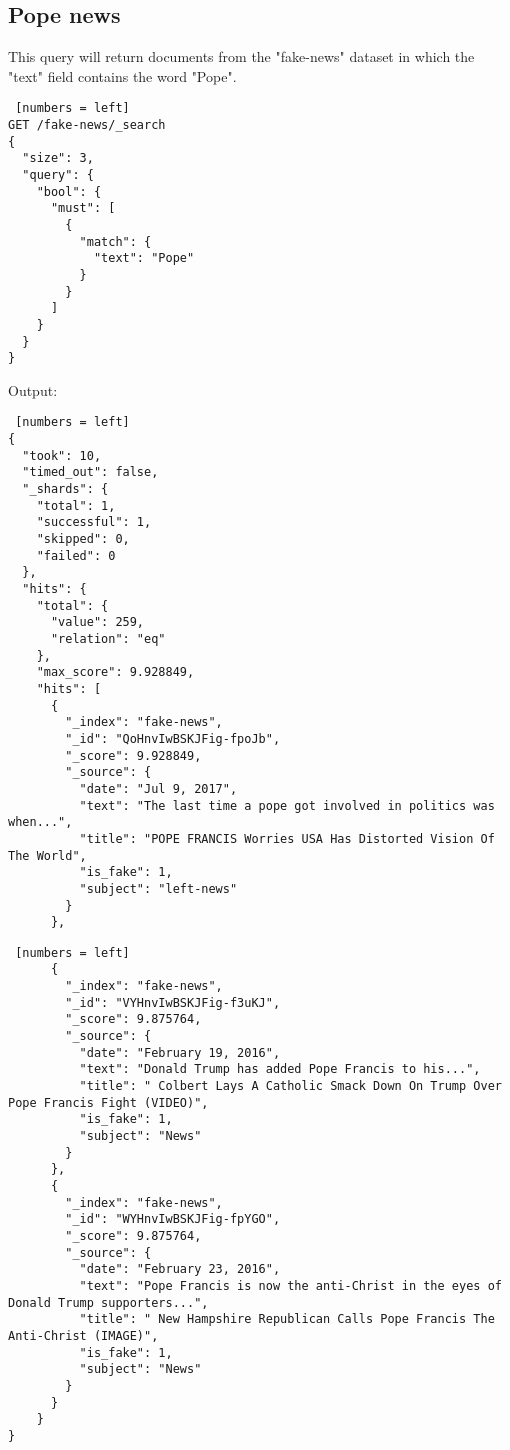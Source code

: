 \subsection{Pope news}
This query will return documents from the "fake-news" dataset in which the "text" field contains the word "Pope".\\

\begin{algorithm}[ht]
\caption{Pope news}
\begin{lstlisting} [numbers = left]
GET /fake-news/_search
{ 
  "size": 3,
  "query": {
    "bool": {
      "must": [
        {
          "match": {
            "text": "Pope"
          }
        }
      ]
    }
  }
}
\end{lstlisting}
\end{algorithm}
\newpage

Output:
\begin{algorithm}[h!]
\caption{Pope news}
\begin{lstlisting} [numbers = left]
{
  "took": 10,
  "timed_out": false,
  "_shards": {
    "total": 1,
    "successful": 1,
    "skipped": 0,
    "failed": 0
  },
  "hits": {
    "total": {
      "value": 259,
      "relation": "eq"
    },
    "max_score": 9.928849,
    "hits": [
      {
        "_index": "fake-news",
        "_id": "QoHnvIwBSKJFig-fpoJb",
        "_score": 9.928849,
        "_source": {
          "date": "Jul 9, 2017",
          "text": "The last time a pope got involved in politics was when...",
          "title": "POPE FRANCIS Worries USA Has Distorted Vision Of The World",
          "is_fake": 1,
          "subject": "left-news"
        }
      },

\end{lstlisting}
\end{algorithm}
\newpage
\begin{algorithm}[h!]
\caption{Pope news}
\begin{lstlisting} [numbers = left]
      {
        "_index": "fake-news",
        "_id": "VYHnvIwBSKJFig-f3uKJ",
        "_score": 9.875764,
        "_source": {
          "date": "February 19, 2016",
          "text": "Donald Trump has added Pope Francis to his...",
          "title": " Colbert Lays A Catholic Smack Down On Trump Over Pope Francis Fight (VIDEO)",
          "is_fake": 1,
          "subject": "News"
        }
      },
      {
        "_index": "fake-news",
        "_id": "WYHnvIwBSKJFig-fpYGO",
        "_score": 9.875764,
        "_source": {
          "date": "February 23, 2016",
          "text": "Pope Francis is now the anti-Christ in the eyes of Donald Trump supporters...",
          "title": " New Hampshire Republican Calls Pope Francis The Anti-Christ (IMAGE)",
          "is_fake": 1,
          "subject": "News"
        }
      }
    }
}

\end{lstlisting}
\end{algorithm}
\newpage
